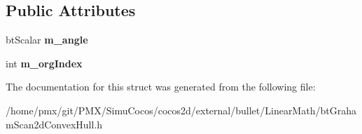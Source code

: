 \subsection*{Public Attributes}
\begin{DoxyCompactItemize}
\item 
\mbox{\label{structGrahamVector3_a224e64d09847d70c77b419c8e8ae2f98}} 
bt\+Scalar {\bfseries m\+\_\+angle}
\item 
\mbox{\label{structGrahamVector3_addfae5bb53d7e2b96a3c64b545dcf416}} 
int {\bfseries m\+\_\+org\+Index}
\end{DoxyCompactItemize}


The documentation for this struct was generated from the following file\+:\begin{DoxyCompactItemize}
\item 
/home/pmx/git/\+P\+M\+X/\+Simu\+Cocos/cocos2d/external/bullet/\+Linear\+Math/bt\+Graham\+Scan2d\+Convex\+Hull.\+h\end{DoxyCompactItemize}
